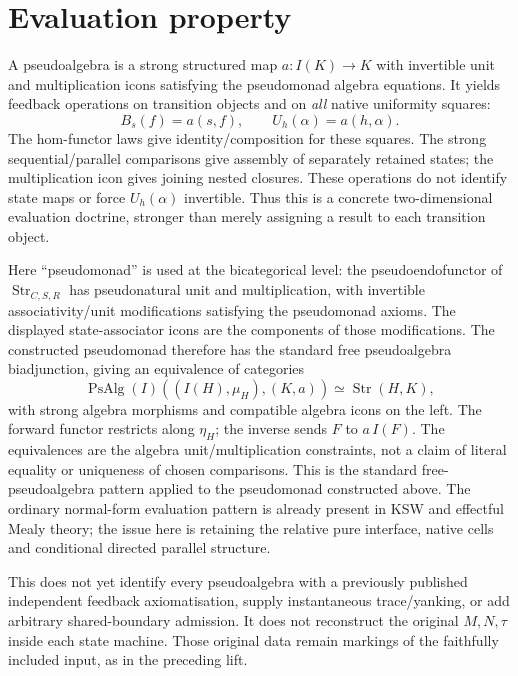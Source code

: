 \documentclass{article}
\begin{document}
\section{Evaluation property}
A pseudoalgebra is a strong structured map $a:I(K)\to K$ with invertible unit and multiplication icons satisfying the pseudomonad algebra equations. It yields feedback operations on transition objects and on \emph{all} native uniformity squares:
\[
B_s(f)=a(s,f),\qquad U_h(\alpha)=a(h,\alpha).
\]
The hom-functor laws give identity/composition for these squares. The strong sequential/parallel comparisons give assembly of separately retained states; the multiplication icon gives joining nested closures. These operations do not identify state maps or force $U_h(\alpha)$ invertible. Thus this is a concrete two-dimensional evaluation doctrine, stronger than merely assigning a result to each transition object.

Here ``pseudomonad'' is used at the bicategorical level: the pseudoendofunctor of $\operatorname{Str}_{C,S,R}$ has pseudonatural unit and multiplication, with invertible associativity/unit modifications satisfying the pseudomonad axioms. The displayed state-associator icons are the components of those modifications. The constructed pseudomonad therefore has the standard free pseudoalgebra biadjunction, giving an equivalence of categories
\[
\operatorname{PsAlg}(I)((I(H),\mu_H),(K,a))\simeq
\operatorname{Str}(H,K),
\]
with strong algebra morphisms and compatible algebra icons on the left. The forward functor restricts along $\eta_H$; the inverse sends $F$ to $a\,I(F)$. The equivalences are the algebra unit/multiplication constraints, not a claim of literal equality or uniqueness of chosen comparisons. This is the standard free-pseudoalgebra pattern applied to the pseudomonad constructed above. The ordinary normal-form evaluation pattern is already present in KSW and effectful Mealy theory; the issue here is retaining the relative pure interface, native cells and conditional directed parallel structure.

This does not yet identify every pseudoalgebra with a previously published independent feedback axiomatisation, supply instantaneous trace/yanking, or add arbitrary shared-boundary admission. It does not reconstruct the original $M,N,\tau$ inside each state machine. Those original data remain markings of the faithfully included input, as in the preceding lift.
\end{document}
